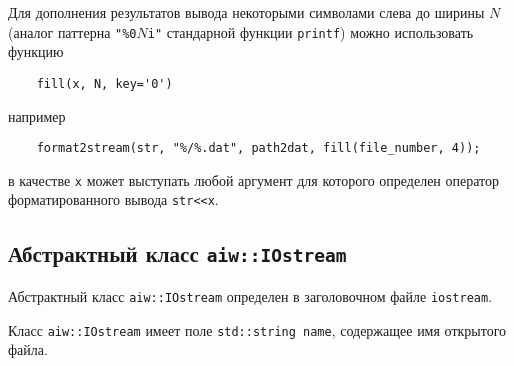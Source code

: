 Для дополнения результатов вывода некоторыми символами слева до 
ширины $N$ (аналог паттерна \verb'"%0'$N$\verb'i"' стандарной функции
\verb'printf') можно использовать функцию
\begin{verbatim}
    fill(x, N, key='0') 
\end{verbatim}
например
\begin{verbatim}
    format2stream(str, "%/%.dat", path2dat, fill(file_number, 4)); 
\end{verbatim}
в качестве \verb'x' может
выступать любой аргумент для которого определен оператор
форматированного вывода \verb'str<<x'. 


\subsection{Абстрактный класс {\tt aiw::IOstream}}
Абстрактный класс \verb'aiw::IOstream' определен в заголовочном файле \verb'iostream'.

Класс \verb'aiw::IOstream' имеет поле \verb'std::string name', содержащее имя открытого файла.

